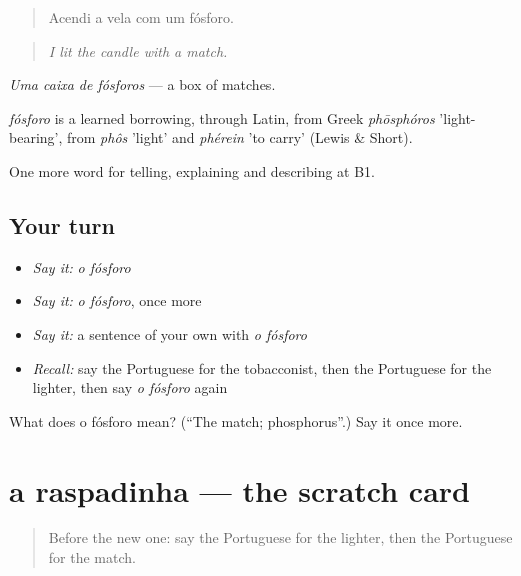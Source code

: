 \begin{quote}
Acendi a vela com um fósforo.
\end{quote}

\begin{quote}
\emph{I lit the candle with a match.}
\end{quote}

\emph{Uma caixa de fósforos} — a box of matches.

\begin{cousinweb}
\emph{fósforo} is a learned borrowing, through Latin, from Greek \emph{phōsphóros} 'light-bearing', from \emph{phôs} 'light' and \emph{phérein} 'to carry' (Lewis \& Short).
\end{cousinweb}

\begin{grammarlens}[title={What you've built}]
One more word for telling, explaining and describing at B1.
\end{grammarlens}

\subsection*{Your turn}
\begin{itemize}
\raggedright
  \item \emph{Say it:} \emph{o fósforo}
  \item \emph{Say it:} \emph{o fósforo}, once more
  \item \emph{Say it:} a sentence of your own with \emph{o fósforo}
  \item \emph{Recall:} say the Portuguese for the tobacconist, then the Portuguese for the lighter, then say \emph{o fósforo} again
\end{itemize}

\begin{tcolorbox}[breakable,colback=teal!4,colframe=teal!35!black,title={Before you move on}]
What does o fósforo mean? (\textquotedblleft{}The match; phosphorus\textquotedblright{}.) Say it once more.
\end{tcolorbox}
\section[a raspadinha]{a raspadinha — the scratch card}

\label{lesson:PT-C448-raspadinha}



\begin{quote}
Before the new one: say the Portuguese for the lighter, then the Portuguese for the match.
\end{quote}

